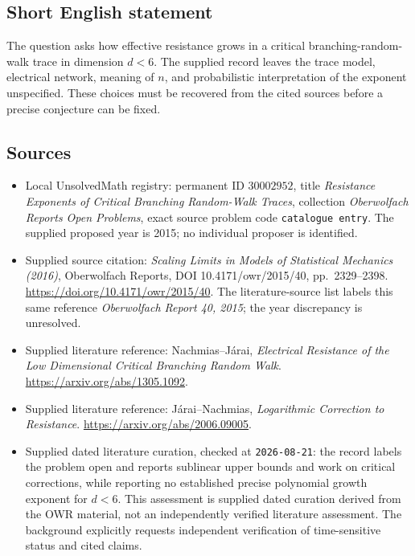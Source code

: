 \documentclass[11pt]{article}
\begin{document}
\subsection{Short English statement}
The question asks how effective resistance grows in a critical branching-random-walk trace in dimension \(d<6\). The supplied record leaves the trace model, electrical network, meaning of \(n\), and probabilistic interpretation of the exponent unspecified. These choices must be recovered from the cited sources before a precise conjecture can be fixed.
\subsection{Sources}
\begin{itemize}
\item Local UnsolvedMath registry: permanent ID \(30002952\), title \emph{Resistance Exponents of Critical Branching Random-Walk Traces}, collection \emph{Oberwolfach Reports Open Problems}, exact source problem code \texttt{catalogue entry}. The supplied proposed year is 2015; no individual proposer is identified.
\item Supplied source citation: \emph{Scaling Limits in Models of Statistical Mechanics (2016)}, Oberwolfach Reports, DOI 10.4171/owr/2015/40, pp.\ 2329--2398. \url{https://doi.org/10.4171/owr/2015/40}. The literature-source list labels this same reference \emph{Oberwolfach Report 40, 2015}; the year discrepancy is unresolved.
\item Supplied literature reference: Nachmias--Járai, \emph{Electrical Resistance of the Low Dimensional Critical Branching Random Walk}. \url{https://arxiv.org/abs/1305.1092}.
\item Supplied literature reference: Járai--Nachmias, \emph{Logarithmic Correction to Resistance}. \url{https://arxiv.org/abs/2006.09005}.
\item Supplied dated literature curation, checked at \texttt{2026-08-21}: the record labels the problem open and reports sublinear upper bounds and work on critical corrections, while reporting no established precise polynomial growth exponent for \(d<6\). This assessment is supplied dated curation derived from the OWR material, not an independently verified literature assessment. The background explicitly requests independent verification of time-sensitive status and cited claims.
\end{itemize}
\end{document}
